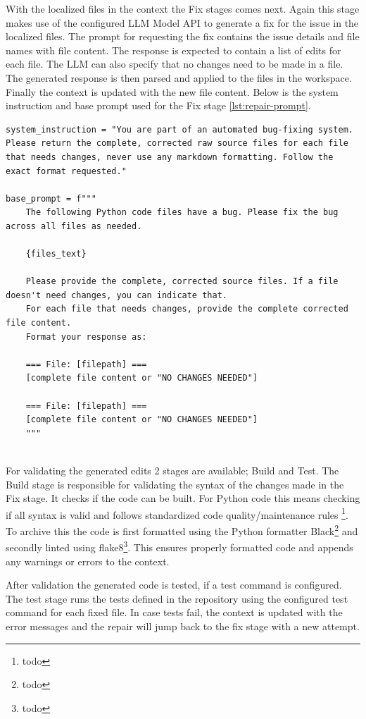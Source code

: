 With the localized files in the context the Fix stages comes next. Again this stage makes use of the configured LLM Model API to generate a fix for the issue in the localized files. The prompt for requesting the fix contains the issue details and file names with file content. The response is expected to contain a list of edits for each file. The LLM can also specify that no changes need to be made in a file. The generated response is then parsed and applied to the files in the workspace. Finally the context is updated with the new file content. Below is the system instruction and base prompt used for the Fix stage \ref{lst:repair-prompt}.

\begin{lstlisting}[caption={Repair Prompt}, label={lst:repair-prompt}]
system_instruction = "You are part of an automated bug-fixing system. Please return the complete, corrected raw source files for each file that needs changes, never use any markdown formatting. Follow the exact format requested."

base_prompt = f"""
    The following Python code files have a bug. Please fix the bug across all files as needed.

    {files_text}

    Please provide the complete, corrected source files. If a file doesn't need changes, you can indicate that.
    For each file that needs changes, provide the complete corrected file content.
    Format your response as:

    === File: [filepath] ===
    [complete file content or "NO CHANGES NEEDED"]

    === File: [filepath] ===
    [complete file content or "NO CHANGES NEEDED"]
    """
    
\end{lstlisting}

For validating the generated edits 2 stages are available; Build and Test. The Build stage is responsible for validating the syntax of the changes made in the Fix stage. It checks if the code can be built. For Python code this means checking if all syntax is valid and follows standardized code quality/maintenance rules \footnote{todo}. To archive this the code is first formatted using the Python formatter Black\footnote{todo} and secondly linted using flake8\footnote{todo}. This ensures properly formatted code and appends any warnings or errors to the context.

After validation the generated code is tested, if a test command is configured. The test stage runs the tests defined in the repository using the configured test command for each fixed file. In case tests fail, the context is updated with the error messages and the repair will jump back to the fix stage with a new attempt.

